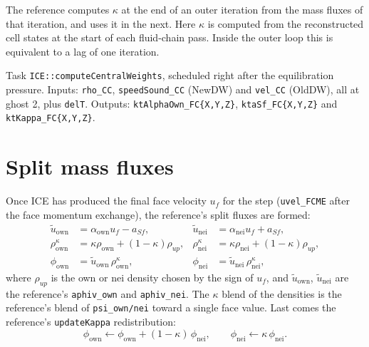 \documentclass[11pt]{article}
\newcommand{\code}[1]{\texttt{\small #1}}
\newcommand{\own}{\mathrm{own}}
\newcommand{\nei}{\mathrm{nei}}
\begin{document}
\begin{deviation}
The reference computes $\kappa$ at the end of an outer iteration from the mass fluxes of
that iteration, and uses it in the next. Here $\kappa$ is computed from the reconstructed
cell states at the start of each fluid-chain pass. Inside the outer loop this is equivalent
to a lag of one iteration.
\end{deviation}

\begin{incode}
Task \code{ICE::computeCentralWeights}, scheduled right after the equilibration pressure.
Inputs: \code{rho\_CC}, \code{speedSound\_CC} (NewDW) and \code{vel\_CC} (OldDW), all at ghost 2,
plus \code{delT}. Outputs: \code{ktAlphaOwn\_FC\{X,Y,Z\}}, \code{ktaSf\_FC\{X,Y,Z\}} and
\code{ktKappa\_FC\{X,Y,Z\}}.
\end{incode}

\section{Split mass fluxes}\label{sec:flux}

Once ICE has produced the final face velocity $u_f$ for the step (\code{uvel\_FCME} after the
face momentum exchange), the reference's split fluxes are formed:
\begin{align}
  \tilde u_\own &= \alpha_\own u_f - a_{Sf}, &
  \tilde u_\nei &= \alpha_\nei u_f + a_{Sf}, \label{eq:aphiv}\\
  \rho^\kappa_\own &= \kappa\rho_\own + (1-\kappa)\rho_{up}, &
  \rho^\kappa_\nei &= \kappa\rho_\nei + (1-\kappa)\rho_{up}, \\
  \phi_\own &= \tilde u_\own\,\rho^\kappa_\own, &
  \phi_\nei &= \tilde u_\nei\,\rho^\kappa_\nei ,
\end{align}
where $\rho_{up}$ is the own or nei density chosen by the sign of $u_f$, and
$\tilde u_\own$, $\tilde u_\nei$ are the reference's \code{aphiv\_own} and \code{aphiv\_nei}. The
$\kappa$ blend of the densities is the reference's blend of \code{psi\_own/nei} toward a
single face value. Last comes the reference's \code{updateKappa} redistribution:
\begin{equation}
  \phi_\own \leftarrow \phi_\own + (1-\kappa)\,\phi_\nei,\qquad
  \phi_\nei \leftarrow \kappa\,\phi_\nei .
\end{equation}
\end{document}
